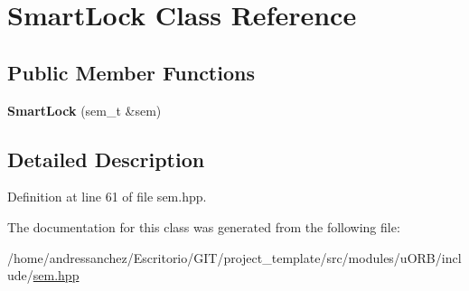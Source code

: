 \hypertarget{classSmartLock}{}\section{Smart\+Lock Class Reference}
\label{classSmartLock}
\subsection*{Public Member Functions}
\begin{DoxyCompactItemize}
\item 
\mbox{\label{classSmartLock_ad766076b970b1f92d0b37d80257113ea}} 
{\bfseries Smart\+Lock} (sem\+\_\+t \&sem)
\end{DoxyCompactItemize}


\subsection{Detailed Description}


Definition at line 61 of file sem.\+hpp.



The documentation for this class was generated from the following file\+:\begin{DoxyCompactItemize}
\item 
/home/andressanchez/\+Escritorio/\+G\+I\+T/project\+\_\+template/src/modules/u\+O\+R\+B/include/\hyperlink{sem_8hpp}{sem.\+hpp}\end{DoxyCompactItemize}
